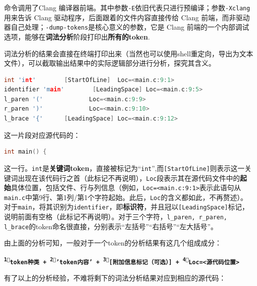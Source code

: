 \documentclass[UTF8,a4paper,10pt]{ctexart}
\begin{document}
命令调用了Clang 编译器前端。其中参数\texttt{-E}依旧代表只进行预编译；参数\texttt{-Xclang}用来告诉 Clang 驱动程序，后面跟着的文件内容直接传给 Clang 前端，而非驱动器自己处理；\texttt{-dump-tokens}是核心意义的参数，它是 Clang 前端的一个内部调试选项，能够在\textbf{词法分析}阶段打印出\textbf{所有的token}.

词法分析的结果会直接在终端打印出来（当然也可以使用shell重定向，导出为文本文件），可以截取输出结果中的实际逻辑部分进行分析，探究其含义。

\vspace{1em}


\begin{lstlisting}[title=词法分析片段 1, frame=trbl,language={C++}]
int 'int'        [StartOfLine]  Loc=<main.c:9:1>
identifier 'main'        [LeadingSpace] Loc=<main.c:9:5>
l_paren '('             Loc=<main.c:9:9>
r_paren ')'             Loc=<main.c:9:10>
l_brace '{'      [LeadingSpace] Loc=<main.c:9:12>
\end{lstlisting}

这一片段对应源代码的：

\begin{lstlisting}[frame=trbl,language={C++}]
int main() {
\end{lstlisting}
这一行。\texttt{int}是\textbf{关键词token}，直接被标记为“\texttt{int}”,而\texttt{[StartOfLine]}则表示这一关键词出现在该代码行之首（此标记不再说明），\texttt{Loc}段表示其在源代码文件中的\textbf{起始}具体位置，包括文件、行与列信息（例如，\texttt{Loc=<main.c:9:1>}表示此语句从\texttt{main.c}中第9行、第1列/第1个字符起始。此后，\texttt{Loc}的含义都如此，不再赘述）。对于\texttt{main}，将其识别为\texttt{identifier}，即\textbf{标识符}，并且冠以\texttt{[LeadingSpace]}标记，说明前面有空格（此标记不再说明）。对于三个字符，\texttt{l\_paren, r\_paren, l\_brace}的token命名很直接，分别表示“左括号”“右括号”“左大括号”。

由上面的分析可知，一般对于一个token的分析结果有这几个组成成分：

\begin{center}
    \textcolor{deepred}{\textbf{\texttt{\textsuperscript{\textcircled{1}}token种类 + \textsuperscript{\textcircled{2}}'token内容' + \textsuperscript{\textcircled{3}}[附加信息标记（可选）] + \textsuperscript{\textcircled{4}}Loc=<源代码位置>}}}
\end{center}

有了以上的分析经验，不难将剩下的词法分析结果对应到相应的源代码：

\vspace{1em}
\end{document}
